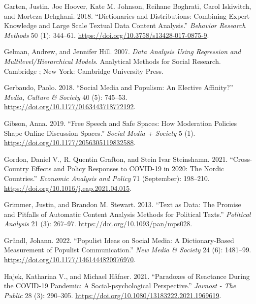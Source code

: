 \documentclass[
]{ccr}
\newlength{\cslhangindent}
\newlength{\cslentryspacingunit} %
\newenvironment{CSLReferences}[2] %
 {%
  \setlength{\parindent}{0pt}
  \ifodd #1
  \let\oldpar\par
  \def\par{\hangindent=\cslhangindent\oldpar}
  \fi
  \setlength{\parskip}{#2\cslentryspacingunit}
 }%
 {}
\begin{document}
\begin{CSLReferences}{1}{0}
\leavevmode{}%
Garten, Justin, Joe Hoover, Kate M. Johnson, Reihane Boghrati, Carol
Iskiwitch, and Morteza Dehghani. 2018. {``Dictionaries and
Distributions: {Combining} Expert Knowledge and Large Scale Textual Data
Content Analysis.''} \emph{Behavior Research Methods} 50 (1): 344--61.
\url{https://doi.org/10.3758/s13428-017-0875-9}.

\leavevmode{}%
Gelman, Andrew, and Jennifer Hill. 2007. \emph{Data Analysis Using
Regression and Multilevel/Hierarchical Models}. Analytical Methods for
Social Research. {Cambridge ; New York}: {Cambridge University Press}.

\leavevmode{}%
Gerbaudo, Paolo. 2018. {``Social Media and Populism: An Elective
Affinity?''} \emph{Media, Culture \& Society} 40 (5): 745--53.
\url{https://doi.org/10.1177/0163443718772192}.

\leavevmode{}%
Gibson, Anna. 2019. {``Free {Speech} and {Safe Spaces}: {How Moderation
Policies Shape Online Discussion Spaces}.''} \emph{Social Media +
Society} 5 (1). \url{https://doi.org/10.1177/2056305119832588}.

\leavevmode{}%
Gordon, Daniel V., R. Quentin Grafton, and Stein Ivar Steinshamn. 2021.
{``Cross-Country Effects and Policy Responses to {COVID-19} in 2020:
{The Nordic} Countries.''} \emph{Economic Analysis and Policy} 71
(September): 198--210. \url{https://doi.org/10.1016/j.eap.2021.04.015}.

\leavevmode{}%
Grimmer, Justin, and Brandon M. Stewart. 2013. {``Text as Data: {The}
Promise and Pitfalls of Automatic Content Analysis Methods for Political
Texts.''} \emph{Political Analysis} 21 (3): 267--97.
\url{https://doi.org/10.1093/pan/mps028}.

\leavevmode{}%
Gründl, Johann. 2022. {``Populist Ideas on Social Media: {A}
Dictionary-Based Measurement of Populist Communication.''} \emph{New
Media \& Society} 24 (6): 1481--99.
\url{https://doi.org/10.1177/1461444820976970}.

\leavevmode{}%
Hajek, Katharina V., and Michael Häfner. 2021. {``Paradoxes of
{Reactance During} the {COVID-19 Pandemic}: {A Social-psychological
Perspective}.''} \emph{Javnost - The Public} 28 (3): 290--305.
\url{https://doi.org/10.1080/13183222.2021.1969619}.


\end{CSLReferences}
\end{document}
